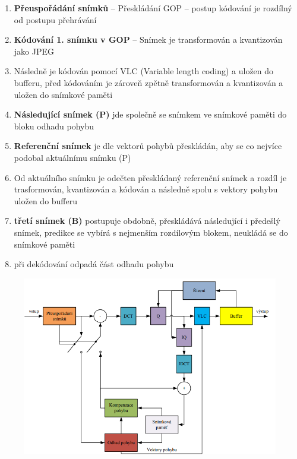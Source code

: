 \begin{enumerate}
    \item \textbf{Přeuspořádání snímků} -- Přeskládání GOP – postup kódování je rozdílný od postupu přehrávání
    \item \textbf{Kódování 1. snímku v GOP} -- Snímek je transformován a kvantizován jako JPEG
\item Následně je kódován pomocí VLC (Variable length coding) a uložen do bufferu, před kódováním je zároveň zpětně
transformován a kvantizován a uložen do snímkové paměti
\item \textbf{Následující snímek (P)} jde společně se snímkem ve snímkové paměti do bloku odhadu pohybu
\item \textbf{Referenční snímek} je dle vektorů pohybů přeskládán, aby se co nejvíce podobal aktuálnímu snímku (P)
\item Od aktuálního snímku je odečten přeskládaný referenční snímek a rozdíl je trasformován, kvantizován a kódován a
následně spolu s vektory pohybu uložen do bufferu
\item \textbf{třetí snímek (B)} postupuje obdobně, přeskládává následující i předešlý snímek, predikce se vybírá s nejmenším rozdílovým blokem, neukládá se do snímkové paměti
\item při dekódování odpadá část odhadu pohybu
\end{enumerate}

\begin{figure}[ht]
    \centering
    \includegraphics[width=0.7\linewidth]{MPC-ZMD//images/mpeg-koder.png}
\end{figure}
\FloatBarrier

